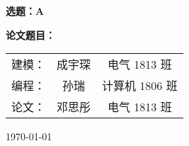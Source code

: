 \begin{titlepage}
  \begin{center}
    \vspace*{\fill}
    {\bfseries 选题：A}
    \vspace*{\fill}

    {\bfseries 论文题目：}

    \itshape
    \begin{tabular}{ccc}
      建模：& 成宇琛 & 电气 1813 班 \\
      编程：& 孙瑞 & 计算机 1806 班 \\
      论文：& 邓思彤 & 电气 1813 班 \\
    \end{tabular}

    \today
  \end{center}
\end{titlepage}